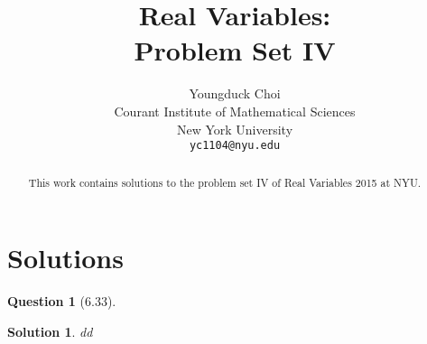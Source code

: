 \documentclass{article} %
\title{Real Variables: \\
Problem Set IV}
\author{
Youngduck Choi \\
Courant Institute of Mathematical Sciences \\
New York University \\
\texttt{yc1104@nyu.edu} \\
}
\theoremstyle{quest}
\newtheorem*{question}{Question}
\newtheorem*{solution}{Solution}
\begin{document}
\maketitle

\begin{abstract}
This work contains solutions to the problem set IV of Real Variables 2015 at NYU.
\end{abstract}

\section{Solutions}

\begin{question}[6.33]
\end{question}
\begin{solution}
dd
\end{solution}

\bigskip
\end{document}

